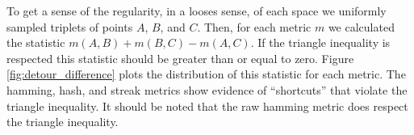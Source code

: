 





























To get a sense of the regularity, in a looses sense, of each space we uniformly sampled triplets of points $A$, $B$, and $C$.
Then, for each metric $m$ we calculated the statistic $m(A, B) + m(B, C) - m(A, C)$.
If the triangle inequality is respected this statistic should be greater than or equal to zero.
Figure \ref{fig:detour_difference} plots the distribution of this statistic for each metric.
The hamming, hash, and streak metrics show evidence of ``shortcuts'' that violate the triangle inequality.
It should be noted that the raw hamming metric does respect the triangle inequality.


